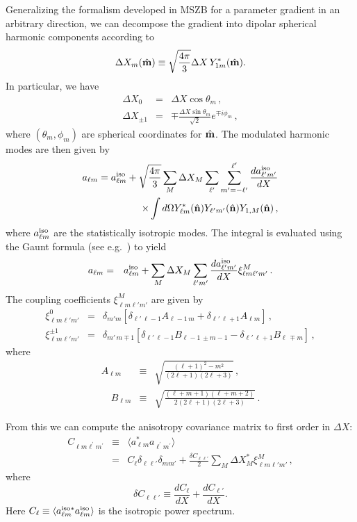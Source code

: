 \documentclass[twocolumn,aps,prd,showpacs]{revtex4}
\def\beq{\begin{equation}}
\def\eeq{\end{equation}}
\def\bra{\langle}
\def\ket{\rangle}
\begin{document}
   Generalizing the formalism developed in MSZB for a parameter gradient 
in an arbitrary direction, we can decompose the gradient into dipolar 
spherical harmonic components according to
\beq
\Delta X_m(\hat{\bf{m}}) \equiv \sqrt{\frac{4\pi}{3}}\Delta X\,Y_{1m}^*(\hat{\bf{m}}).
\eeq
In particular, we have
\begin{eqnarray}
\Delta X_0      &=& \Delta X\cos\theta_m\,,\\
\Delta X_{\pm1} &=& \mp\frac{\Delta X\sin\theta_m}{\sqrt2}e^{\mp i\phi_m}\,,
\end{eqnarray}
where $(\theta_m,\phi_m)$ are spherical coordinates for $\hat{\bf{m}}$.  
The modulated harmonic modes are then given by
\begin{eqnarray}
\nonumber a_{\ell m} = a_{\ell m}^{\rm iso}
 + \sqrt{\frac{4\pi}{3}}\sum_M\Delta X_M\sum_{\ell'}
   \sum_{m'=-\ell'}^{\ell'}\frac{da_{\ell'm'}^{\rm iso}}{dX}\\
\times \int d\Omega Y_{\ell m}^*(\hat{\bf{n}})
   Y_{\ell'm'}(\hat{\bf{n}})Y_{1,M}(\hat{\bf{n}})\, ,
\end{eqnarray}
where $a_{\ell m}^{\rm iso}$ are the statistically isotropic modes.  
The integral is evaluated using the Gaunt formula (see e.g.~\cite{Grad:1994}) 
to yield
\begin{eqnarray}
a_{\ell m} &=& a_{\ell m}^{\rm iso} + \sum_M\Delta X_M
   \sum_{\ell'm'}\frac{da_{\ell'm'}^{\rm iso}}{dX}\xi_{\ell m\ell'm'}^M\,.
\end{eqnarray}
The coupling coefficients $\xi^M_{\ell m\ell'm'}$ are given by
\begin{eqnarray}\label{eqn:xi0}
\xi_{\ell m \ell' m'}^0 &=& \delta_{m'm} \left[ \delta_{\ell' \, \ell-1}
 A_{\ell-1 \, m} + \delta_{\ell' \, \ell+1} A_{\ell  m}  \right]\,, \\
\label{eqn:xi1}
\xi_{\ell m \ell' m'}^{\pm1} &=& \delta_{m' \, m\mp1}
 \left[ \delta_{\ell' \, \ell-1} B_{\ell-1 \, \pm m-1} - \delta_{\ell' \, \ell+1}
 B_{\ell  \, \mp m}  \right]\,,
\end{eqnarray}
where
\begin{eqnarray}
A_{\ell m} &\equiv& \sqrt{\frac{\left( \ell + 1\right) ^2-m^2}
{\left( 2\ell+1\right)\left( 2\ell+3\right)}}\,,\\
\quad B_{\ell m} &\equiv&  \sqrt{\frac{\left(\ell+m+1 \right) \left(\ell+m +2 \right)}
{2\left( 2\ell+1\right)\left( 2\ell+3\right)}}\,.
\end{eqnarray}

From this we can compute the anisotropy covariance matrix to first order in 
$\Delta X$:
\begin{eqnarray}\label{eq:cov}
 C_{\ell m\ell^\prime m^\prime}
  &\equiv&\langle a_{\ell m}^\ast a_{\ell^\prime m^\prime} \rangle\nonumber\\
 &=& C_{\ell} \delta_{\ell \ell'} \delta_{m m'} + \frac{\delta C_{\ell \ell' }}{2}
 \sum_M \Delta X^*_M \xi_{\ell m \ell' m'}^M\,,
\end{eqnarray}
where
\beq
\delta C_{\ell\ell'} \equiv \frac{dC_{\ell}}{dX} + \frac{dC_{\ell'}}{dX}.
\eeq
Here $C_\ell \equiv \bra a_{\ell m}^{\rm iso*}a_{\ell m}^{\rm iso}\ket$ is the 
isotropic power spectrum.
\end{document}
